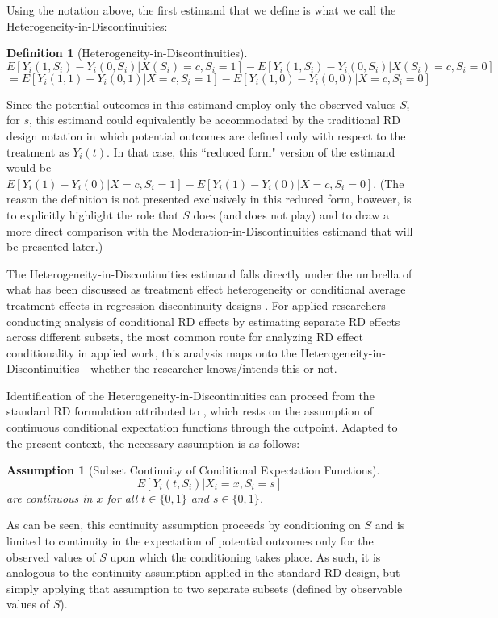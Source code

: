 \documentclass[12pt]{article}
\makeatletter
\renewcommand{\subsection}{\@startsection{subsection}{2}{0mm}{-\baselineskip}{0.25\baselineskip}{\raggedright\normalfont\normalsize\bf}}
\newtheorem{assumption}{\small\sc Assumption}
\newtheorem{definition}{\small\sc Definition}
\makeatother
\begin{document}
Using the notation above, the first estimand that we define is what we call the Heterogeneity-in-Discontinuities:
\begin{definition}[Heterogeneity-in-Discontinuities]
$$E[Y_i(1,S_i) - Y_i(0,S_i) | X(S_i)=c, S_i = 1] - E[Y_i(1,S_i) - Y_i(0,S_i) | X(S_i)=c, S_i = 0]$$
$$= E[Y_i(1,1) - Y_i(0,1) | X=c, S_i = 1] - E[Y_i(1,0) - Y_i(0,0) | X=c, S_i = 0]$$
\end{definition}
Since the potential outcomes in this estimand employ only the observed values $S_i$ for $s$, this estimand could equivalently be accommodated by the traditional RD design notation in which potential outcomes are defined only with respect to the treatment as $Y_i(t)$. In that case, this ``reduced form" version of the estimand would be $E[Y_i(1) - Y_i(0) | X=c, S_i = 1] - E[Y_i(1) - Y_i(0) | X=c, S_i = 0]$. (The reason the definition is not presented exclusively in this reduced form, however, is to explicitly highlight the role that $S$ does (and does not play) and to draw a more direct comparison with the Moderation-in-Discontinuities estimand that will be presented later.)

The Heterogeneity-in-Discontinuities estimand falls directly under the umbrella of what has been discussed as treatment effect heterogeneity or conditional average treatment effects in regression discontinuity designs \citep{hsu2019testing}. For applied researchers conducting analysis of conditional RD effects by estimating separate RD effects across different subsets, the most common route for analyzing RD effect conditionality in applied work, this analysis maps onto the Heterogeneity-in-Discontinuities---whether the researcher knows/intends this or not.

\subsection{Identification and Estimation}

Identification of the Heterogeneity-in-Discontinuities can proceed from the standard RD formulation attributed to \cite{hahn2001identification} \citep[see also][]{imbens2008regression}, which rests on the assumption of continuous conditional expectation functions through the cutpoint. Adapted to the present context, the necessary assumption is as follows:

\begin{assumption}[Subset Continuity of Conditional Expectation Functions] \label{assump:subset_cont}
$$E[Y_i(t,S_i) | X_i = x, S_i = s]$$
are continuous in $x$ for all $t \in \{ 0, 1\}$ and $s \in \{ 0, 1\}$.
\end{assumption}
As can be seen, this continuity assumption proceeds by conditioning on $S$ and is limited to continuity in the expectation of potential outcomes only for the observed values of $S$ upon which the conditioning takes place. As such, it is analogous to the continuity assumption applied in the standard RD design, but simply applying that assumption to two separate subsets 
(defined by observable values of $S$).
\end{document}

